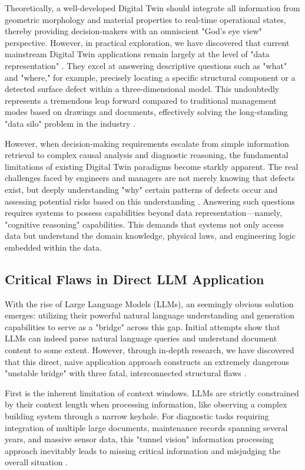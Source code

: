 Theoretically, a well-developed Digital Twin should integrate all information from geometric morphology and material properties to real-time operational states, thereby providing decision-makers with an omniscient "God's eye view" perspective. However, in practical exploration, we have discovered that current mainstream Digital Twin applications remain largely at the level of "data representation" \cite{negri2017review}. They excel at answering descriptive questions such as "what" and "where," for example, precisely locating a specific structural component or a detected surface defect within a three-dimensional model. This undoubtedly represents a tremendous leap forward compared to traditional management modes based on drawings and documents, effectively solving the long-standing "data silo" problem in the industry \cite{bruno2018historic}.

However, when decision-making requirements escalate from simple information retrieval to complex causal analysis and diagnostic reasoning, the fundamental limitations of existing Digital Twin paradigms become starkly apparent. The real challenges faced by engineers and managers are not merely knowing that defects exist, but deeply understanding "why" certain patterns of defects occur and assessing potential risks based on this understanding \cite{hamdan2021semantic}. Answering such questions requires systems to possess capabilities beyond data representation—namely, "cognitive reasoning" capabilities. This demands that systems not only access data but understand the domain knowledge, physical laws, and engineering logic embedded within the data.

\subsection{Critical Flaws in Direct LLM Application}

With the rise of Large Language Models (LLMs), an seemingly obvious solution emerges: utilizing their powerful natural language understanding and generation capabilities to serve as a "bridge" across this gap. Initial attempts show that LLMs can indeed parse natural language queries and understand document content to some extent. However, through in-depth research, we have discovered that this direct, naive application approach constructs an extremely dangerous "unstable bridge" with three fatal, interconnected structural flaws \cite{ji2023survey}.

First is the inherent limitation of context windows. LLMs are strictly constrained by their context length when processing information, like observing a complex building system through a narrow keyhole. For diagnostic tasks requiring integration of multiple large documents, maintenance records spanning several years, and massive sensor data, this "tunnel vision" information processing approach inevitably leads to missing critical information and misjudging the overall situation \cite{liu2023lost}.

